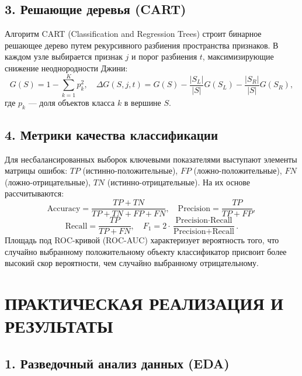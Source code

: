 \documentclass[14pt,a4paper]{extarticle}
\begin{document}
\subsection*{3. Решающие деревья (CART)}

Алгоритм CART (Classification and Regression Trees) строит бинарное решающее дерево путем рекурсивного разбиения пространства признаков. В каждом узле выбирается признак $j$ и порог разбиения $t$, максимизирующие снижение неоднородности Джини:
\begin{equation}
  G(S) = 1 - \sum_{k=1}^K p_k^2, \quad \Delta G(S, j, t) = G(S) - \frac{|S_L|}{|S|} G(S_L) - \frac{|S_R|}{|S|} G(S_R),
\end{equation}
где $p_k$ --- доля объектов класса $k$ в вершине $S$.

\subsection*{4. Метрики качества классификации}

Для несбалансированных выборок ключевыми показателями выступают элементы матрицы ошибок: $TP$ (истинно-положительные), $FP$ (ложно-положительные), $FN$ (ложно-отрицательные), $TN$ (истинно-отрицательные). На их основе рассчитываются:
\begin{equation}
  \text{Accuracy} = \frac{TP + TN}{TP + TN + FP + FN}, \quad \text{Precision} = \frac{TP}{TP + FP},
\end{equation}
\begin{equation}
  \text{Recall} = \frac{TP}{TP + FN}, \quad F_1 = 2 \cdot \frac{\text{Precision} \cdot \text{Recall}}{\text{Precision} + \text{Recall}}.
\end{equation}
Площадь под ROC-кривой (ROC-AUC) характеризует вероятность того, что случайно выбранному положительному объекту классификатор присвоит более высокий скор вероятности, чем случайно выбранному отрицательному.

\section*{ПРАКТИЧЕСКАЯ РЕАЛИЗАЦИЯ И РЕЗУЛЬТАТЫ}

\subsection*{1. Разведочный анализ данных (EDA)}
\end{document}
